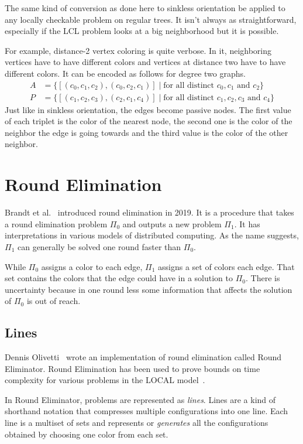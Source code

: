 \documentclass[english, 12pt, a4paper, sci, a-1b, online]{aaltothesis}
\begin{document}
The same kind of conversion as done here to sinkless orientation be applied to any locally checkable problem on regular trees. It isn't always as straightforward, especially if the LCL problem looks at a big neighborhood but it is possible.

For example, distance-2 vertex coloring is quite verbose. In it, neighboring vertices have to have different colors and vertices at distance two have to have different colors. It can be encoded as follows for degree two graphs.
\begin{align*}
A &= \{[(c_0, c_1, c_2), (c_0, c_2, c_1)] \mid \text{for all distinct } c_0, c_1\text{ and }c_2 \} \\
P &= \{[(c_1, c_2, c_3), (c_2, c_1, c_4)] \mid \text{for all distinct } c_1, c_2, c_3\text{ and }c_4 \}
\end{align*}
Just like in sinkless orientation, the edges become passive nodes. The first value of each triplet is the color of the nearest node, the second one is the color of the neighbor the edge is going towards and the third value is the color of the other neighbor.

\section{Round Elimination}

Brandt et al.~\cite{speedup} introduced round elimination in 2019. It is a procedure that takes a round elimination problem $\Pi_0$ and outputs a new problem $\Pi_1$. It has interpretations in various models of distributed computing. As the name suggests, $\Pi_1$ can generally be solved one round faster than $\Pi_0$.

While $\Pi_0$ assigns a color to each edge, $\Pi_1$ assigns a set of colors each edge. That set contains the colors that the edge could have in a solution to $\Pi_0$. There is uncertainty because in one round less some information that affects the solution of $\Pi_0$ is out of reach.

\subsection{Lines}

Dennis Olivetti~\cite{RE} wrote an implementation of round elimination called Round Eliminator. Round Elimination has been used to prove bounds on time complexity for various problems in the LOCAL model~\cite{tc1, tc2, tc3}.

In Round Eliminator, problems are represented as \emph{lines}. Lines are a kind of shorthand notation that compresses multiple configurations into one line. Each line is a multiset of sets and represents or \emph{generates} all the configurations obtained by choosing one color from each set.~\cite{RE}
\end{document}
